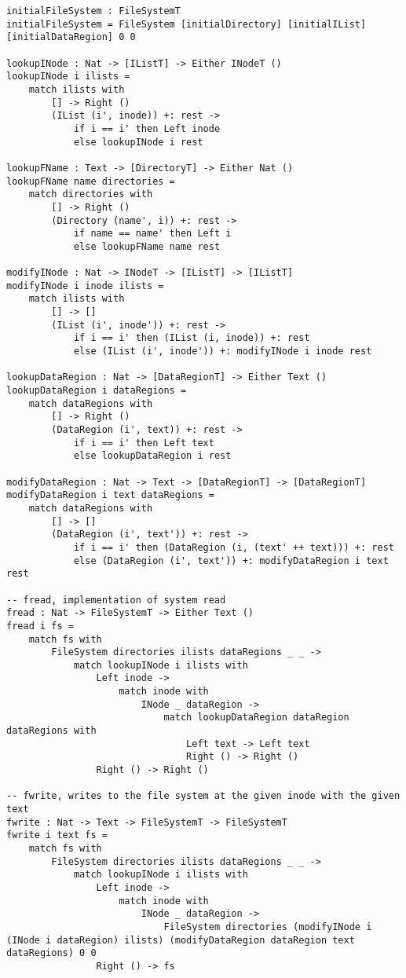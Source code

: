 \documentclass[logo,bsc,singlespacing,parskip]{infthesis}
\begin{document}
\begin{lstlisting}[language=unison]
initialFileSystem : FileSystemT
initialFileSystem = FileSystem [initialDirectory] [initialIList] [initialDataRegion] 0 0

lookupINode : Nat -> [IListT] -> Either INodeT ()
lookupINode i ilists =
    match ilists with
        [] -> Right ()
        (IList (i', inode)) +: rest ->
            if i == i' then Left inode
            else lookupINode i rest

lookupFName : Text -> [DirectoryT] -> Either Nat ()
lookupFName name directories =
    match directories with
        [] -> Right ()
        (Directory (name', i)) +: rest ->
            if name == name' then Left i
            else lookupFName name rest

modifyINode : Nat -> INodeT -> [IListT] -> [IListT]
modifyINode i inode ilists =
    match ilists with
        [] -> []
        (IList (i', inode')) +: rest ->
            if i == i' then (IList (i, inode)) +: rest
            else (IList (i', inode')) +: modifyINode i inode rest

lookupDataRegion : Nat -> [DataRegionT] -> Either Text ()
lookupDataRegion i dataRegions =
    match dataRegions with
        [] -> Right ()
        (DataRegion (i', text)) +: rest ->
            if i == i' then Left text
            else lookupDataRegion i rest

modifyDataRegion : Nat -> Text -> [DataRegionT] -> [DataRegionT]
modifyDataRegion i text dataRegions =
    match dataRegions with
        [] -> []
        (DataRegion (i', text')) +: rest ->
            if i == i' then (DataRegion (i, (text' ++ text))) +: rest
            else (DataRegion (i', text')) +: modifyDataRegion i text rest

-- fread, implementation of system read
fread : Nat -> FileSystemT -> Either Text ()
fread i fs =
    match fs with
        FileSystem directories ilists dataRegions _ _ ->
            match lookupINode i ilists with
                Left inode ->
                    match inode with
                        INode _ dataRegion ->
                            match lookupDataRegion dataRegion dataRegions with
                                Left text -> Left text
                                Right () -> Right ()
                Right () -> Right ()

-- fwrite, writes to the file system at the given inode with the given text
fwrite : Nat -> Text -> FileSystemT -> FileSystemT
fwrite i text fs =
    match fs with
        FileSystem directories ilists dataRegions _ _ ->
            match lookupINode i ilists with
                Left inode ->
                    match inode with
                        INode _ dataRegion ->
                            FileSystem directories (modifyINode i (INode i dataRegion) ilists) (modifyDataRegion dataRegion text dataRegions) 0 0
                Right () -> fs


\end{lstlisting}
\end{document}
